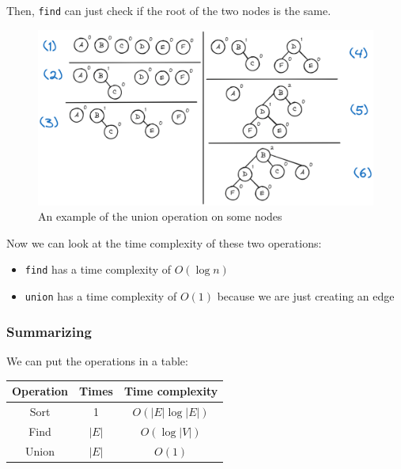 \documentclass[12pt]{extarticle}
\begin{document}
Then, \texttt{find} can just check if the root of the two nodes is the same.

\begin{figure}[H]
    \centering
    \includegraphics[width=\textwidth]{assets/computer_science_2/union_find.png}
    \caption{An example of the union operation on some nodes}
    \label{fig:union_find}
\end{figure}

Now we can look at the time complexity of these two operations:
\begin{itemize}
    \item \texttt{find} has a time complexity of $O(\log n)$
    \item \texttt{union} has a time complexity of $O(1)$ because we are just creating an edge
\end{itemize}

\subsubsection{Summarizing}

We can put the operations in a table:

\begin{table}[H]
    \centering
    \begin{tabular}{|c|c|c|}
        \hline
        \textbf{Operation} & \textbf{Times} & \textbf{Time complexity} \\
        \hline
        Sort               & 1              & $O(|E| \log |E|)$        \\
        Find               & $|E|$          & $O(\log |V|)$            \\
        Union              & $|E|$          & $O(1)$                   \\
        \hline
    \end{tabular}
\end{table}
\end{document}
